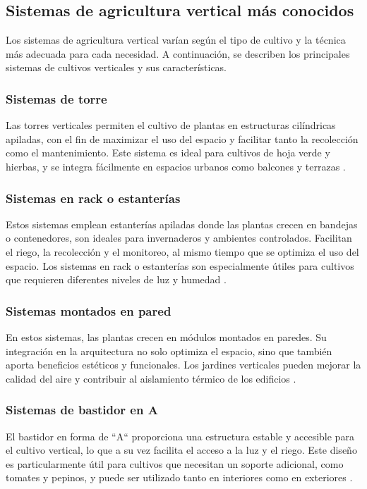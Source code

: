\subsection{Sistemas de agricultura vertical más conocidos}
Los sistemas de agricultura vertical varían según el tipo de cultivo y la técnica más adecuada para cada necesidad.
A continuación, se describen los principales sistemas de cultivos verticales y sus características.

\subsubsection{Sistemas de torre}
Las torres verticales permiten el cultivo de plantas en estructuras cilíndricas apiladas, con el fin de maximizar el uso del espacio y facilitar tanto la recolección como el mantenimiento. Este sistema es ideal para cultivos de hoja verde y hierbas, y se integra fácilmente en espacios urbanos como balcones y terrazas \cite{CULTIVOS:TIPOS}.

\subsubsection{Sistemas en rack o estanterías}
Estos sistemas emplean estanterías apiladas donde las plantas crecen en bandejas o contenedores, son ideales para invernaderos y ambientes controlados. Facilitan el riego, la recolección y el monitoreo, al mismo tiempo que se optimiza el uso del espacio.
Los sistemas en rack o estanterías son especialmente útiles para cultivos que requieren diferentes niveles de luz y humedad \cite{CULTIVOS:TIPOS}.

\subsubsection{Sistemas montados en pared}
En estos sistemas, las plantas crecen en módulos montados en paredes. Su integración en la arquitectura no solo optimiza el espacio, sino que también aporta beneficios estéticos y funcionales.
Los jardines verticales pueden mejorar la calidad del aire y contribuir al aislamiento térmico de los edificios \cite{CULTIVOS:TIPOS}.

\subsubsection{Sistemas de bastidor en A}
El bastidor en forma de ``A`` proporciona una estructura estable y accesible para el cultivo vertical, lo que a su vez facilita el acceso a la luz y el riego.
Este diseño es particularmente útil para cultivos que necesitan un soporte adicional, como tomates y pepinos, y puede ser utilizado tanto en interiores como en exteriores \cite{CULTIVOS:TIPOS}.

